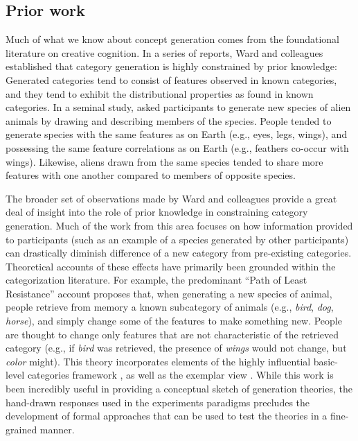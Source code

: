 \documentclass[12pt]{article}
\begin{document}
\begin{flushleft}
\section{Prior work}

Much of what we know about concept generation comes from the foundational literature on creative cognition. In a series of reports, Ward and colleagues \citep{ward1995s,ward1994structured,marsh1999inadvertent,ward2002role,smith1993constraining} established that category generation is highly constrained by prior knowledge: Generated categories tend to consist of features observed in known categories, and they tend to exhibit the distributional properties as found in known categories. In a seminal study, \cite{ward1994structured} asked participants to generate new species of alien animals by drawing and describing members of the species. People tended to generate species with the same features as on Earth (e.g., eyes, legs, wings), and possessing the same feature correlations as on Earth (e.g., feathers co-occur with wings). Likewise, aliens drawn from the same species tended to share more features with one another compared to members of opposite species. 

The broader set of observations made by Ward and colleagues provide a great deal of insight into the role of prior knowledge in constraining category generation. Much of the work from this area \citep[e.g.,][]{smith1993constraining,marsh1999inadvertent} focuses on how information provided to participants (such as an example of a species generated by other participants) can drastically diminish difference of a new category from pre-existing categories. Theoretical accounts of these effects have primarily been grounded within the categorization literature. For example, the predominant ``Path of Least Resistance'' account \citep[see][]{ward1994structured,ward1995s,ward2002role} proposes that, when generating a new species of animal, people retrieve from memory a known subcategory of animals (e.g., {\em bird}, {\em dog}, {\em horse}), and simply change some of the features to make something new. People are thought to change only features that are not characteristic of the retrieved category (e.g., if {\em bird} was retrieved, the presence of {\em wings} would not change, but {\em color} might). This theory incorporates elements of the highly influential basic-level categories framework \citep{rosch1975cognitive,rosch1976basic}, as well as the exemplar view \citep{medin1978context,brooks1978nonanalytic}. While this work is been incredibly useful in providing a conceptual sketch of generation theories, the hand-drawn responses used in the experiments paradigms precludes the development of formal approaches that can be used to test the theories in a fine-grained manner.


\end{flushleft}
\end{document}
